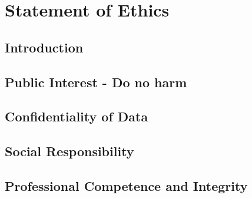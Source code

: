 \chapter{Statement of Ethics}
\label{ch:ethics}
\section{Introduction}

\section{Public Interest - Do no harm}

\section{Confidentiality of Data}

\section{Social Responsibility}

\section{Professional Competence and Integrity}